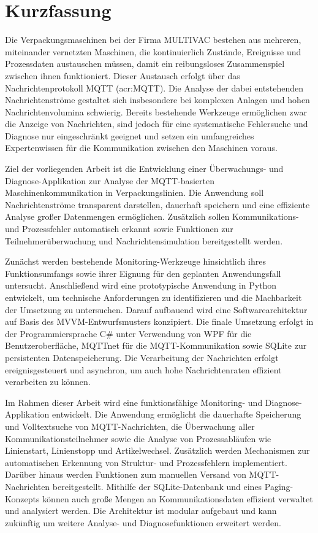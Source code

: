 \chapter*{Kurzfassung} %
Die Verpackungsmaschinen bei der Firma MULTIVAC bestehen aus mehreren, miteinander vernetzten Maschinen, die kontinuierlich Zustände, Ereignisse und Prozessdaten austauschen müssen, damit ein reibungsloses Zusammenspiel zwischen ihnen funktioniert. 
Dieser Austausch erfolgt über das Nachrichtenprotokoll MQTT (\acrlong{acr:MQTT}). Die Analyse der dabei entstehenden Nachrichtenströme gestaltet sich insbesondere bei komplexen Anlagen und hohen Nachrichtenvolumina schwierig. Bereits bestehende Werkzeuge ermöglichen zwar die Anzeige von Nachrichten, sind jedoch für eine systematische Fehlersuche und Diagnose nur eingeschränkt geeignet und setzen ein umfangreiches Expertenwissen für die Kommunikation zwischen den Maschinen voraus.

Ziel der vorliegenden Arbeit ist die  Entwicklung einer Überwachungs- und Diagnose-Applikation zur Analyse der MQTT-basierten Maschinenkommunikation in Verpackungslinien. Die Anwendung soll Nachrichtenströme transparent darstellen, dauerhaft speichern und eine effiziente Analyse großer Datenmengen ermöglichen. Zusätzlich sollen Kommunikations- und Prozessfehler automatisch erkannt sowie Funktionen zur Teilnehmerüberwachung und Nachrichtensimulation bereitgestellt werden.

Zunächst werden bestehende Monitoring-Werkzeuge hinsichtlich ihres Funktionsumfangs sowie ihrer Eignung für den geplanten Anwendungsfall untersucht. Anschließend wird eine prototypische Anwendung in Python entwickelt, um technische Anforderungen zu identifizieren und die Machbarkeit der Umsetzung zu untersuchen. Darauf aufbauend wird eine Softwarearchitektur auf Basis des MVVM-Entwurfsmusters konzipiert. Die finale Umsetzung erfolgt in der Programmiersprache C\# unter Verwendung von WPF für die Benutzeroberfläche, MQTTnet für die MQTT-Kommunikation sowie SQLite zur persistenten Datenspeicherung. Die Verarbeitung der Nachrichten erfolgt ereignisgesteuert und asynchron, um auch hohe Nachrichtenraten effizient verarbeiten zu können.

Im Rahmen dieser Arbeit wird eine funktionsfähige Monitoring- und Diagnose-Applikation entwickelt. Die Anwendung ermöglicht die dauerhafte Speicherung und Volltextsuche von MQTT-Nachrichten, die Überwachung aller Kommunikationsteilnehmer sowie die Analyse von Prozessabläufen wie Linienstart, Linienstopp und Artikelwechsel. Zusätzlich werden Mechanismen zur automatischen Erkennung von Struktur- und Prozessfehlern implementiert. Darüber hinaus werden Funktionen zum manuellen Versand von MQTT-Nachrichten bereitgestellt. Mithilfe der SQLite-Datenbank und eines Paging-Konzepts können auch große Mengen an Kommunikationsdaten effizient verwaltet und analysiert werden. Die Architektur ist modular aufgebaut und kann zukünftig um weitere Analyse- und Diagnosefunktionen erweitert werden.
\clearpage

